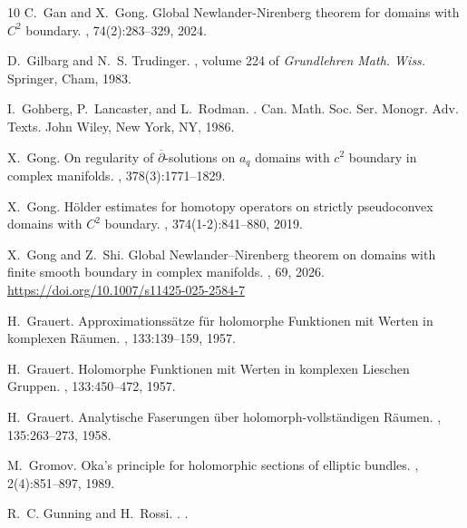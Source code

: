 \documentclass[11pt]{amsart}
\numberwithin{equation}{section}
\theoremstyle{definition}
\begin{document}
\begin{thebibliography}{10}
C.~Gan and X.~Gong.
\newblock Global {Newlander}-{Nirenberg} theorem for domains with {{\(C^2\)}}
  boundary.
, 74(2):283--329, 2024.

D.~Gilbarg and N.~S. Trudinger.
, volume 224 of {\em Grundlehren Math. Wiss.}
\newblock Springer, Cham, 1983.

I.~Gohberg, P.~Lancaster, and L.~Rodman.
.
\newblock Can. Math. Soc. Ser. Monogr. Adv. Texts. John Wiley, New York, NY,
  1986.

X.~Gong.
\newblock On regularity of $\overline\partial$-solutions on $a_q$ domains with
  $c^2$ boundary in complex manifolds.
, 378(3):1771--1829.

X.~Gong.
\newblock H{\"o}lder estimates for homotopy operators on strictly pseudoconvex
  domains with {{\(C^2\)}} boundary.
, 374(1-2):841--880, 2019.

X.~Gong and Z.~Shi.
\newblock Global {N}ewlander--{N}irenberg theorem on domains with finite smooth
  boundary in complex manifolds.
, 69, 2026.
\newblock \url{https://doi.org/10.1007/s11425-025-2584-7}  

H.~Grauert.
\newblock Approximationss\"atze f\"ur holomorphe {F}unktionen mit {W}erten in
  komplexen {R}\"aumen.
, 133:139--159, 1957.

H.~Grauert.
\newblock Holomorphe {F}unktionen mit {W}erten in komplexen {L}ieschen
  {G}ruppen.
, 133:450--472, 1957.

H.~Grauert.
\newblock Analytische {F}aserungen \"uber holomorph-vollst{\"a}ndigen
  {R}{\"a}umen.
, 135:263--273, 1958.

M.~Gromov.
\newblock Oka's principle for holomorphic sections of elliptic bundles.
, 2(4):851--897, 1989.

R.~C. Gunning and H.~Rossi.
.
.


\end{thebibliography}
\end{document}
